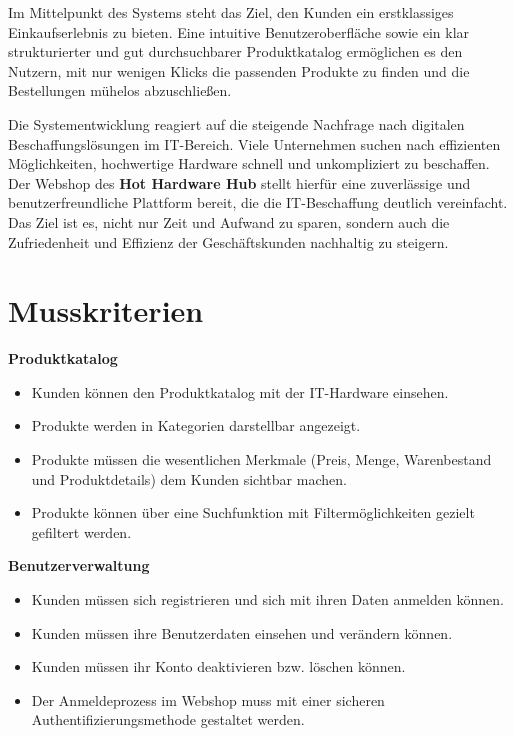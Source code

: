 \documentclass[%
	ngerman,
	12pt,
	a4paper,
	oneside,
	parskip=full
]{scrbook}
\begin{document}
Im Mittelpunkt des Systems steht das Ziel, den Kunden ein erstklassiges Einkaufserlebnis zu bieten.
Eine intuitive Benutzeroberfläche sowie ein klar strukturierter und gut durchsuchbarer Produktkatalog ermöglichen es den Nutzern, mit nur wenigen Klicks die passenden Produkte zu finden und die Bestellungen mühelos abzuschließen.

Die Systementwicklung reagiert auf die steigende Nachfrage nach digitalen Beschaffungslösungen im IT-Bereich.
Viele Unternehmen suchen nach effizienten Möglichkeiten, hochwertige Hardware schnell und unkompliziert zu beschaffen.
Der Webshop des \textbf{Hot Hardware Hub} stellt hierfür eine zuverlässige und benutzerfreundliche Plattform bereit, die die IT-Beschaffung deutlich vereinfacht.
Das Ziel ist es, nicht nur Zeit und Aufwand zu sparen, sondern auch die Zufriedenheit und Effizienz der Geschäftskunden nachhaltig zu steigern.

\section{Musskriterien}
	\vspace{0.5cm}
	\textbf{Produktkatalog}
	\begin{itemize}
		\item Kunden können den Produktkatalog mit der IT-Hardware einsehen.
		\item Produkte werden in Kategorien darstellbar angezeigt.
		\item Produkte müssen die wesentlichen Merkmale (Preis, Menge, Warenbestand und Produktdetails) dem Kunden sichtbar machen.
		\item Produkte können über eine Suchfunktion mit Filtermöglichkeiten gezielt gefiltert werden.
	\end{itemize}

	\vspace{0.5cm}
	\textbf{Benutzerverwaltung}
	\begin{itemize}
		\item Kunden müssen sich registrieren und sich mit ihren Daten anmelden können.
		\item Kunden müssen ihre Benutzerdaten einsehen und verändern können.
		\item Kunden müssen ihr Konto deaktivieren bzw. löschen können.
		\item Der Anmeldeprozess im Webshop muss mit einer sicheren Authentifizierungsmethode gestaltet werden.
	\end{itemize}
\end{document}

